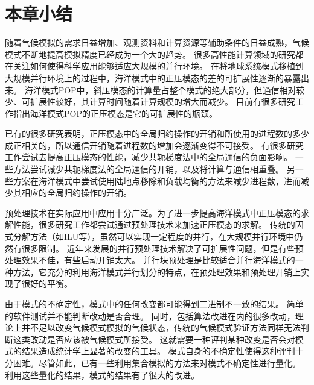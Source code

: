 \section{本章小结}
\label{related:Conclude}

随着气候模拟的需求日益增加、观测资料和计算资源等辅助条件的日益成熟，气候模式不断地提高模拟精度已经成为一个大的趋势。
很多高性能计算领域的研究都在关注如何使得科学应用能够适应大规模的并行环境。 
在将地球系统模式移植到大规模并行环境上的过程中，海洋模式中的正压模态的差的可扩展性逐渐的暴露出来。 
海洋模式POP中，斜压模态的计算量占整个模式的绝大部分，但通信相对较少、可扩展性较好，其计算时间随着计算规模的增大而减少。
目前有很多研究工作指出海洋模式POP的正压模态是它的可扩展性的瓶颈。

已有的很多研究表明，正压模态中的全局归约操作的开销和所使用的进程数的多少成正相关的，所以通信开销随着进程数的增加会逐渐变得不可接受。
有很多研究工作尝试去提高正压模态的性能，减少共轭梯度法中的全局通信的负面影响。
一些方法尝试减少共轭梯度法的全局通信的开销，以及将计算与通信相重叠。 
另一些方案在海洋模式中尝试使用陆地点移除和负载均衡的方法来减少进程数，进而减少其相应的全局归约操作的开销。 

预处理技术在实际应用中应用十分广泛。为了进一步提高海洋模式中正压模态的求解性能，很多研究工作都尝试通过预处理技术来加速正压模态的求解。 
传统的因式分解方法（如ILU等），虽然可以实现一定程度的并行，在大规模并行环境中仍然有很多限制。
近年来发展的并行预处理技术解决了可扩展性问题，但是有些预处理效果不佳，有些启动开销太大。 
并行块预处理是比较适合并行海洋模式的一种方法，它充分的利用海洋模式并行划分的特点，在预处理效果和预处理开销上实现了很好的平衡。

由于模式的不确定性，模式中的任何改变都可能得到二进制不一致的结果。
简单的软件测试并不能判断改动是否合理。
同时，包括算法改进在内的很多改动，理论上并不足以改变气候模式模拟的气候状态，传统的气候模式验证方法同样无法判断这类改动是否应该被气候模式所接受。
这就需要一种评判某种改变是否会对模式的结果造成统计学上显著的改变的工具。
模式自身的不确定性使得这种评判十分困难。尽管如此，已有一些利用集合模拟的方法来对模式不确定性进行量化。
利用这些量化的结果，模式的结果有了很大的改进。 

 


